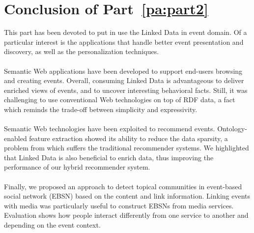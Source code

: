 \chapter*{Conclusion of Part~\ref{pa:part2}}


This part has been devoted to put in use the Linked Data in event domain. Of a particular interest is the applications that handle better event presentation and discovery, as well as the personalization techniques.
\\
\\
Semantic Web applications have been developed to support end-users browsing and creating events. Overall, consuming Linked Data is advantageous to deliver enriched views of events, and to uncover interesting behavioral facts. Still, it was challenging to use conventional Web technologies on top of RDF data, a fact which reminds the trade-off between simplicity and expressivity.
\\
\\
Semantic Web technologies have been exploited to recommend events. Ontology-enabled feature extraction showed its ability to reduce the data sparsity, a problem from which suffers the traditional recommender systems. We highlighted that Linked Data is also beneficial to enrich data, thus improving the performance of our hybrid recommender system.
\\
\\
Finally, we proposed an approach to detect topical communities in event-based social network (EBSN) based on the content and link information. Linking events with media was particularly useful to construct EBSNs from media services. Evaluation shows how people interact differently from one service to another and depending on the event context.